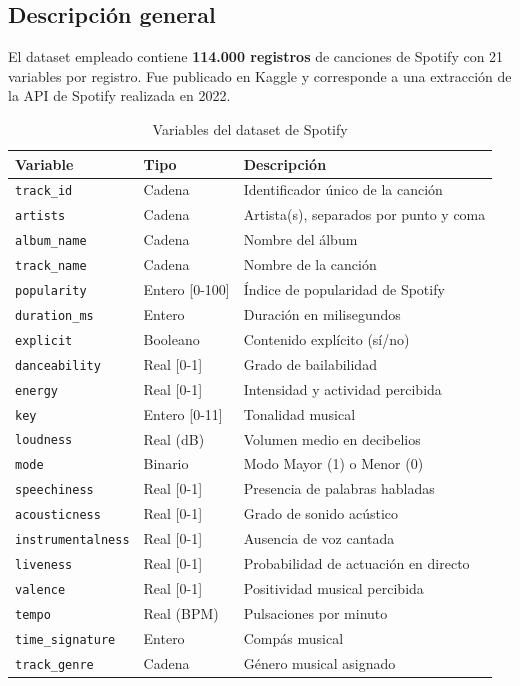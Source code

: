 \documentclass[12pt, a4paper, twoside]{book}
\theoremstyle{definition}
\begin{document}
\subsection{Descripción general}

El dataset empleado contiene \textbf{114.000 registros} de canciones de Spotify
con 21 variables por registro. Fue publicado en Kaggle y corresponde a una
extracción de la API de Spotify realizada en 2022.

\begin{table}[H]
\centering
\caption{Variables del dataset de Spotify}
\label{tab:variables}
\begin{tabular}{lll}
\toprule
\textbf{Variable} & \textbf{Tipo} & \textbf{Descripción} \\
\midrule
\texttt{track\_id} & Cadena & Identificador único de la canción \\
\texttt{artists} & Cadena & Artista(s), separados por punto y coma \\
\texttt{album\_name} & Cadena & Nombre del álbum \\
\texttt{track\_name} & Cadena & Nombre de la canción \\
\texttt{popularity} & Entero [0-100] & Índice de popularidad de Spotify \\
\texttt{duration\_ms} & Entero & Duración en milisegundos \\
\texttt{explicit} & Booleano & Contenido explícito (sí/no) \\
\texttt{danceability} & Real [0-1] & Grado de bailabilidad \\
\texttt{energy} & Real [0-1] & Intensidad y actividad percibida \\
\texttt{key} & Entero [0-11] & Tonalidad musical \\
\texttt{loudness} & Real (dB) & Volumen medio en decibelios \\
\texttt{mode} & Binario & Modo Mayor (1) o Menor (0) \\
\texttt{speechiness} & Real [0-1] & Presencia de palabras habladas \\
\texttt{acousticness} & Real [0-1] & Grado de sonido acústico \\
\texttt{instrumentalness} & Real [0-1] & Ausencia de voz cantada \\
\texttt{liveness} & Real [0-1] & Probabilidad de actuación en directo \\
\texttt{valence} & Real [0-1] & Positividad musical percibida \\
\texttt{tempo} & Real (BPM) & Pulsaciones por minuto \\
\texttt{time\_signature} & Entero & Compás musical \\
\texttt{track\_genre} & Cadena & Género musical asignado \\
\bottomrule
\end{tabular}
\end{table}
\end{document}
